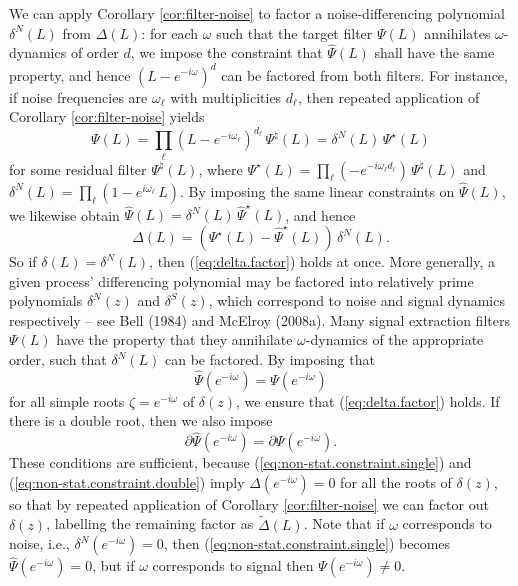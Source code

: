 \documentclass[a4paper]{book}
\begin{document}
 We can apply Corollary \ref{cor:filter-noise} to factor a 
 noise-differencing polynomial $\delta^N (L)$ from $\Delta (L)$:
 for each $\omega$ such that the target filter $\Psi (L)$ annihilates
 $\omega$-dynamics of order $d$, we impose the constraint
 that $\widehat{\Psi} (L)$ shall have the same property, and hence 
 ${(L- e^{-i \omega})}^d$ can be factored from both
 filters.   For instance, if noise frequencies are $\omega_{\ell}$
 with multiplicities $d_{\ell}$, then repeated application of
 Corollary \ref{cor:filter-noise} yields
\[
 \Psi (L) = \prod_{\ell} {(L -  e^{-i \omega_{\ell}})}^{d_{\ell}} \, \Psi^{\natural} (L)
   = \delta^N (L) \, \Psi^{\star} (L)
\]
 for some residual filter $\Psi^{\natural} (L)$, where 
 $\Psi^{\star} (L) = \prod_{\ell} (-e^{-i \omega_{\ell} d_{\ell}}) \, \Psi^{\natural} (L)$
 and $\delta^N (L) = \prod_{\ell} (1 - e^{i \omega_{\ell}} \, L)$.
 By imposing the same linear constraints on $\widehat{\Psi} (L)$, 
 we likewise obtain $\widehat{\Psi} (L) = \delta^N (L) \, \widehat{\Psi}^{\star} (L)$,
 and hence
\begin{equation}
 \label{eq:delta-noise}
\Delta (L) = \left(  {\Psi}^{\star} (L) - 
\widehat{\Psi}^{\star} (L) \right) \, \delta^N (L).
\end{equation}
  So if $\delta (L) = \delta^N (L)$, then (\ref{eq:delta.factor}) 
  holds at once.  More generally, a given process' differencing polynomial
 may be factored into relatively prime polynomials $\delta^N (z)$ and $\delta^S (z)$, 
 which correspond to noise and signal dynamics
 respectively -- see Bell (1984) and McElroy (2008a). 
 Many  signal extraction filters $\Psi (L)$   have the property that they
 annihilate $\omega$-dynamics of the appropriate order, 
 such that $\delta^N (L)$ can be factored.
 By imposing that 
\begin{equation}
\label{eq:non-stat.constraint.single}
 \widehat{\Psi} (e^{-i \omega}) = \Psi (e^{-i \omega})
 \end{equation}
 for  all simple roots $\zeta = e^{-i \omega}$ of $\delta (z)$, we ensure that
  (\ref{eq:delta.factor}) holds. If there is a double root, then we also impose
 \begin{equation}
\label{eq:non-stat.constraint.double}
 \partial \widehat{\Psi} (e^{-i \omega}) = \partial \Psi (e^{-i \omega}).
 \end{equation}
   These conditions are sufficient, because 
  (\ref{eq:non-stat.constraint.single}) and  (\ref{eq:non-stat.constraint.double})
    imply $\Delta (e^{-i \omega}) = 0$
  for all the roots of $\delta (z)$, so that by repeated application of Corollary 
 \ref{cor:filter-noise} we can factor out $\delta (z)$, labelling the
 remaining factor as $\widetilde{\Delta } (L)$.  
   Note that if $\omega$ corresponds to noise, i.e., $\delta^N (e^{-i \omega}) = 0$,
    then (\ref{eq:non-stat.constraint.single}) becomes 
  $ \widehat{\Psi} (e^{-i \omega}) = 0$, but if $\omega$ corresponds to signal
  then $\Psi (e^{-i \omega}) \neq 0$. 
  
\end{document}
